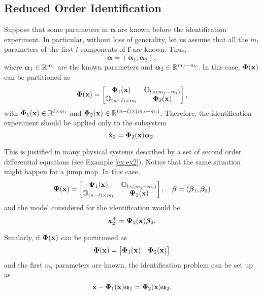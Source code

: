 \subsection{Reduced Order Identification}
Suppose that some parameters in $\bm{\alpha}$ are known before the identification experiment. In particular, without loss of generality, let us assume that all the $m_l$ parameters of the first $l$ components of $\mathbf{f}$ are known. Thus,
%
\begin{equation}
    \bm{\alpha} = \left(\bm{\alpha}_1,\bm{\alpha}_2\right),
\end{equation}
%
where $\bm{\alpha}_1\in\mathbb{R}^{m_l}$ are the known parameters and $\bm{\alpha}_2\in\mathbb{R}^{m_f-m_l}$. In this case, $\bm{\Phi}(\mathbf{x})$ can be partitioned as
%
\begin{equation}
    \bm{\Phi}(\mathbf{x}) = \begin{bmatrix}\bm{\Phi}_1(\mathbf{x})&\mathbb{O}_{l\times (m_f-m_l)}\\\mathbb{O}_{(n-l)\times m_l}&\bm{\Phi}_2(\mathbf{x})\end{bmatrix},
\end{equation}
%
with $\bm{\Phi}_1(\mathbf{x})\in\mathbb{R}^{l\times m_l}$ and $\bm{\Phi}_2(\mathbf{x})\in\mathbb{R}^{(n-l)\times (m_f-m_l)}$.
Therefore, the identification experiment should be applied only to the subsystem
%
\begin{equation}\label{eq:redflow}
\dot{\mathbf{x}}_2=\bm{\Phi}_2(\mathbf{x})\bm{\alpha}_2.
\end{equation}
%

This is justified in many physical systems described by a set of second order differential equations (see Example \ref{ex:ex2}).
Notice that the same situation might happen for a jump map. In this case, 
%
\begin{equation}
    \bm{\Psi}(\mathbf{x}) = \begin{bmatrix}\bm{\Psi}_1(\mathbf{x})&\mathbb{O}_{l\times (m_j-m_l)}\\\mathbb{O}_{(n-l)\times m_l}&\bm{\Psi}_2(\mathbf{x})\end{bmatrix},\quad\bm{\beta} = \left(\bm{\beta}_1,\bm{\beta}_2\right)
\end{equation}
%
and the model considered for the identification would be
%
\begin{equation}
    \label{eq:redjump}{\mathbf{x}}^+_2=\bm{\Psi}_2(\mathbf{x})\bm{\beta}_2.
\end{equation}
%

Similarly, if $\bm{\Phi}(\mathbf{x})$ can be partitioned as
%
\begin{equation}
    \bm{\Phi}(\mathbf{x}) = \begin{bmatrix}\bm{\Phi}_1(\mathbf{x})&\bm{\Phi}_2(\mathbf{x})\end{bmatrix}
\end{equation}
%
and the first $m_l$ parameters are known, the identification problem can be set up as
%
\begin{equation}
    \dot{\mathbf{x}}-\bm{\Phi}_1(\mathbf{x})\bm{\alpha}_1=\bm{\Phi}_2(\mathbf{x})\bm{\alpha}_2.
\end{equation}
%

